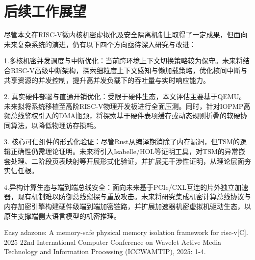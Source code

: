 \documentclass[master, vlined, review]{DissertUESTC}
\begin{document}
	\section{后续工作展望}
	尽管本文在RISC-V微内核机密虚拟化及安全隔离机制上取得了一定成果，但面向未来复杂系统的演进，仍有以下四个方向亟待深入研究与改进：

	1.多核机密并发调度与中断优化：当前跨环境上下文切换策略较为保守。未来将结合RISC-V高级中断架构，探索细粒度上下文感知与懒加载策略，优化核间中断与共享资源的并发控制，提升高并发负载下的吞吐量与实时响应能力。

	2. 真实硬件部署与直通开销优化：受限于硬件生态，本文评估主要基于QEMU。未来拟将系统移植至高阶RISC-V物理开发板进行全面压测。同时，针对IOPMP高频总线鉴权引入的DMA瓶颈，将探索基于硬件表项缓存或动态规则折叠的软硬协同算法，以降低物理访存损耗。

	3. 核心可信组件的形式化验证：尽管Rust从编译期消除了内存漏洞，但TSM的逻辑正确性仍需理论证明。未来将引入Isabelle/HOL等证明工具，对TSM的异常嵌套处理、二阶段页表映射等开展形式化验证，并扩展无干涉性证明，从理论层面夯实信任根。

	4.异构计算生态与端到端总线安全：面向未来基于PCIe/CXL互连的片外独立加速器，现有机制难以防御总线窥探与重放攻击。未来将研究集成机密计算总线协议与内存加密引擎构建硬件级端到端加密链路，并扩展加速器机密虚拟机驱动生态，以原生支撑端侧大语言模型的机密推理。
	
	
	\acknowledgement
	

	

	\appendix
	
	\achievement %

	\begin{enumerate}[label={[\arabic*]}, leftmargin=2em, itemsep=0pt, parsep=0pt]
		
	\item
	  Easy adazone: A memory-safe physical memory isolation framework for risc-v[C]. 2025 22nd International Computer Conference on Wavelet Active Media Technology and Information Processing (ICCWAMTIP), 2025: 1-4.
		
	\end{enumerate}
\end{document}
